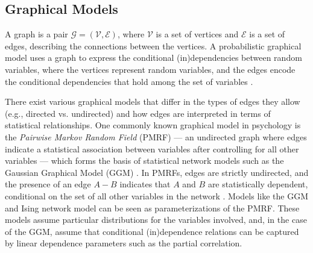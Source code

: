 \documentclass[twoside, 11pt]{article}
\begin{document}
\subsection{Graphical Models} 

A graph is a pair $\mathcal{G} = (\mathcal{V},  \mathcal{E})$, where $\mathcal{V}$ is a set of vertices and $\mathcal{E}$ is a set of edges, describing the connections between the vertices. A probabilistic graphical model uses a graph to express the conditional (in)dependencies between random variables, where the vertices represent random variables, and the edges encode the conditional dependencies that hold among the set of variables \citep{lauritzen1996graphical}. 


There exist various graphical models that differ in the types of edges they allow (e.g., directed vs. undirected) and how edges are interpreted in terms of statistical relationships. One commonly known graphical model in psychology is the \textit{Pairwise Markov Random Field} (PMRF) --- an undirected graph where edges indicate a statistical association between variables after controlling for all other variables ---  which forms the basis of statistical network models such as the Gaussian Graphical Model (GGM) \citep{epskamp_gaussian_2018, epskamp_tutorial_2018}. In PMRFs, edges are strictly undirected, and the presence of an edge $A-B$ indicates that $A$ and $B$ are statistically dependent, conditional on the set of all other variables in the network \citep{borsboom_network_2021}. Models like the GGM and Ising network model can be seen as parameterizations of the PMRF. These models assume particular distributions for the variables involved, and, in the case of the GGM, assume that conditional (in)dependence relations can be captured by linear dependence parameters such as the partial correlation. 
\end{document}
